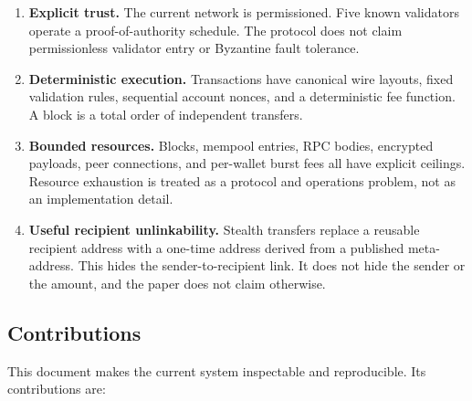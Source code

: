 \documentclass[11pt,a4paper]{article}
\begin{document}
\begin{enumerate}[leftmargin=*]
  \item \textbf{Explicit trust.} The current network is permissioned. Five
        known validators operate a proof-of-authority schedule. The protocol
        does not claim permissionless validator entry or Byzantine fault
        tolerance.
  \item \textbf{Deterministic execution.} Transactions have canonical wire
        layouts, fixed validation rules, sequential account nonces, and a
        deterministic fee function. A block is a total order of independent
        transfers.
  \item \textbf{Bounded resources.} Blocks, mempool entries, RPC bodies,
        encrypted payloads, peer connections, and per-wallet burst fees all
        have explicit ceilings. Resource exhaustion is treated as a protocol
        and operations problem, not as an implementation detail.
  \item \textbf{Useful recipient unlinkability.} Stealth transfers replace a
        reusable recipient address with a one-time address derived from a
        published meta-address. This hides the sender-to-recipient link. It
        does not hide the sender or the amount, and the paper does not claim
        otherwise.
\end{enumerate}

\subsection{Contributions}

This document makes the current system inspectable and reproducible. Its
contributions are:
\end{document}
